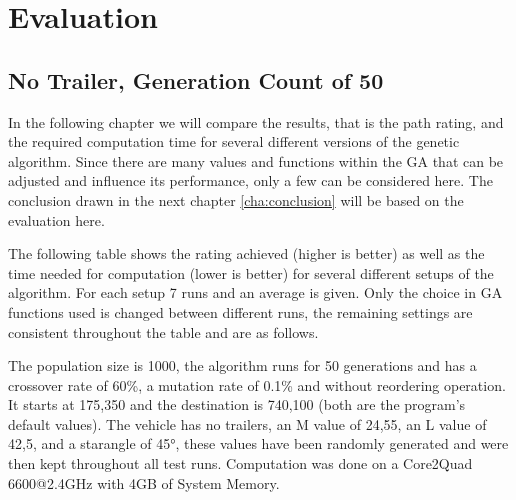 \chapter{Evaluation}
\label{cha:evaluation}

\section{No Trailer, Generation Count of 50}
\label{sec:no_trailer_50}

In the following chapter we will compare the results, that is the path rating, and the required computation time for several different versions of the genetic algorithm.
Since there are many values and functions within the GA that can be adjusted and influence its performance, only a few can be considered here. The conclusion drawn in the next chapter \ref{cha:conclusion} will be based on the evaluation here.

The following table shows the rating achieved (higher is better) as well as the time needed for computation (lower is better) for several different setups of the algorithm. For each setup 7 runs and an average is given. Only the choice in GA functions used is changed between different runs, the remaining settings are consistent throughout the table and are as follows.

The population size is 1000, the algorithm runs for 50 generations and has a crossover rate of 60\%, a mutation rate of 0.1\% and without reordering operation. It starts at 175,350 and the destination is 740,100 (both are the program's default values). The vehicle has no trailers, an M value of 24,55, an L value of 42,5, and a starangle of 45°, these values have been randomly generated and were then kept throughout all test runs.
Computation was done on a Core2Quad 6600@2.4GHz with 4GB of System Memory.

